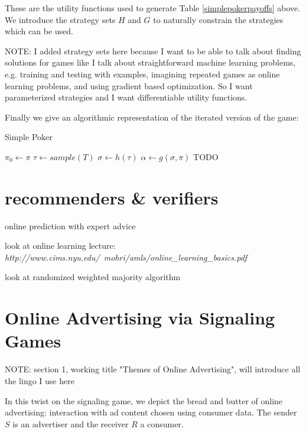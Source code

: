 \documentclass{article}
\begin{document}
\noindent These are the utility functions used to generate Table \ref{simplepokerpayoffs} above. We introduce the strategy sets $H$ and $G$ to naturally constrain the strategies which can be used.

NOTE: I added strategy sets here because I want to be able to talk about finding solutions for games like I talk about straightforward machine learning problems, e.g. training and testing with examples, imagining repeated games as online learning problems, and using gradient based optimization. So I want parameterized strategies and I want differentiable utility functions.

Finally we give an algorithmic representation of the iterated version of the game:
\begin{algorithm}
	\caption{Simple Poker}\label{simplepokeralgo}
	\begin{algorithmic}[1]
	\STATE $\pi_0 \leftarrow \pi$
		\STATE $\tau \leftarrow sample(T)$
		\STATE $\sigma \leftarrow h(\tau)$
		\STATE $\alpha \leftarrow g(\sigma, \pi)$
		\IF{$\tau = \alpha$} \STATE TODO \ENDIF
	\ENDFOR
	\end{algorithmic}
\end{algorithm}

\newpage

\section{recommenders \& verifiers}

online prediction with expert advice

look at online learning lecture: \emph{http://www.cims.nyu.edu/~mohri/amls/online\_learning\_basics.pdf}

look at randomized weighted majority algorithm

\section{Online Advertising via Signaling Games}

NOTE: section 1, working title "Themes of Online Advertising", will introduce all the lingo I use here

In this twist on the signaling game, we depict the bread and butter of online advertising: interaction with ad content chosen using consumer data. The sender $S$ is an advertiser and the receiver $R$ a consumer.
\end{document}
